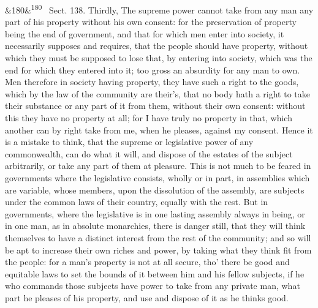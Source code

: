 \documentclass[12pt]{article}
\newcommand{\para}[1][]{\par\noindent\ifx&#1&\else\textsuperscript{\footnotesize #1}~\fi}
\begin{document}
\para[180] Sect. 138. Thirdly, The supreme power cannot take from any man any part of his property without his own consent: for the preservation of property being the end of government, and that for which men enter into society, it necessarily supposes and requires, that the people should have property, without which they must be supposed to lose that, by entering into society, which was the end for which they entered into it; too gross an absurdity for any man to own. Men therefore in society having property, they have such a right to the goods, which by the law of the community are their's, that no body hath a right to take their substance or any part of it from them, without their own consent: without this they have no property at all; for I have truly no property in that, which another can by right take from me, when he pleases, against my consent. Hence it is a mistake to think, that the supreme or legislative power of any commonwealth, can do what it will, and dispose of the estates of the subject arbitrarily, or take any part of them at pleasure. This is not much to be feared in governments where the legislative consists, wholly or in part, in assemblies which are variable, whose members, upon the dissolution of the assembly, are subjects under the common laws of their country, equally with the rest. But in governments, where the legislative is in one lasting assembly always in being, or in one man, as in absolute monarchies, there is danger still, that they will think themselves to have a distinct interest from the rest of the community; and so will be apt to increase their own riches and power, by taking what they think fit from the people: for a man's property is not at all secure, tho' there be good and equitable laws to set the bounds of it between him and his fellow subjects, if he who commands those subjects have power to take from any private man, what part he pleases of his property, and use and dispose of it as he thinks good.
\end{document}
